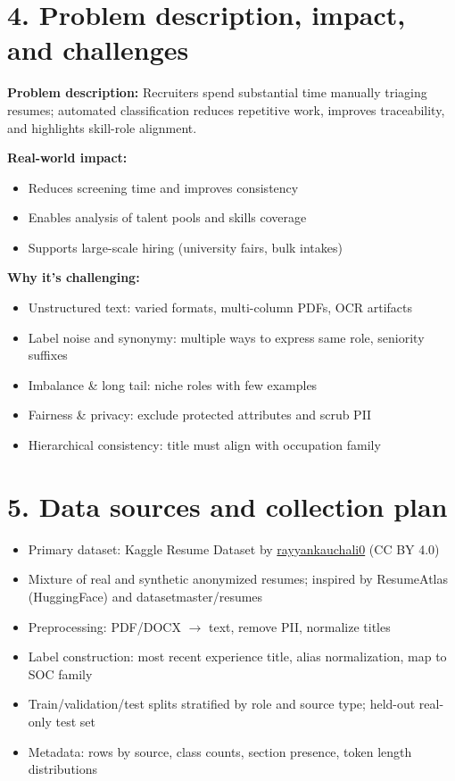 \documentclass[12pt]{article}
\begin{document}
\section*{4. Problem description, impact, and challenges}
\textbf{Problem description:} Recruiters spend substantial time manually triaging resumes; automated classification reduces repetitive work, improves traceability, and highlights skill-role alignment.  

\textbf{Real-world impact:}
\begin{itemize}
  \item Reduces screening time and improves consistency
  \item Enables analysis of talent pools and skills coverage
  \item Supports large-scale hiring (university fairs, bulk intakes)
\end{itemize}

\textbf{Why it's challenging:}
\begin{itemize}
  \item Unstructured text: varied formats, multi-column PDFs, OCR artifacts
  \item Label noise and synonymy: multiple ways to express same role, seniority suffixes
  \item Imbalance \& long tail: niche roles with few examples
  \item Fairness \& privacy: exclude protected attributes and scrub PII
  \item Hierarchical consistency: title must align with occupation family
\end{itemize}

\section*{5. Data sources and collection plan}
\begin{itemize}
  \item Primary dataset: Kaggle Resume Dataset by \href{https://www.kaggle.com/datasets/rayyankauchali0/resume-dataset?resource=download}{rayyankauchali0} (CC BY 4.0)
  \item Mixture of real and synthetic anonymized resumes; inspired by ResumeAtlas (HuggingFace) and datasetmaster/resumes
  \item Preprocessing: PDF/DOCX $\rightarrow$ text, remove PII, normalize titles
  \item Label construction: most recent experience title, alias normalization, map to SOC family
  \item Train/validation/test splits stratified by role and source type; held-out real-only test set
  \item Metadata: rows by source, class counts, section presence, token length distributions
\end{itemize}
\end{document}
